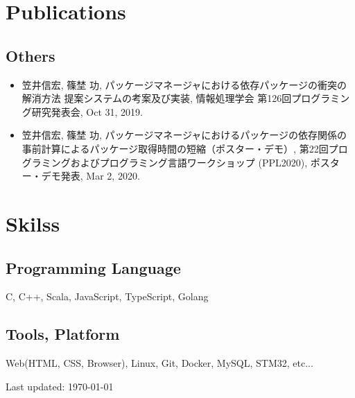 \documentclass[letterpaper]{article}
\def\footerlink{}
\begin{document}
\section*{Publications}
\subsection*{Others}
\begin{itemize}
    \item 笠井信宏, 篠埜 功, パッケージマネージャにおける依存パッケージの衝突の解消方法 提案システムの考案及び実装, 情報処理学会 第126回プログラミング研究発表会, Oct 31, 2019.
    \item 笠井信宏, 篠埜 功, パッケージマネージャにおけるパッケージの依存関係の事前計算によるパッケージ取得時間の短縮（ポスター・デモ）, 第22回プログラミングおよびプログラミング言語ワークショップ (PPL2020), ポスター・デモ発表, Mar 2, 2020.
\end{itemize}
\section*{Skilss}
\subsection*{Programming Language}
C, C++, Scala, JavaScript, TypeScript, Golang
\subsection*{Tools, Platform}
Web(HTML, CSS, Browser), Linux, Git, Docker, MySQL, STM32, etc... 
\bigskip

\begin{center}
  \begin{footnotesize}
    Last updated: \today \\
    \href{\footerlink}{\texttt{\footerlink}}
  \end{footnotesize}
\end{center}
\end{document}
